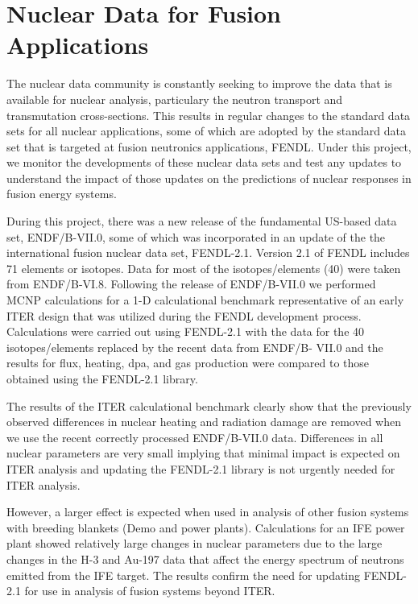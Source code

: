 \chapter{Nuclear Data for Fusion Applications}

The nuclear data community is constantly seeking to improve the data that is
available for nuclear analysis, particulary the neutron transport and
transmutation cross-sections.  This results in regular changes to the standard
data sets for all nuclear applications, some of which are adopted by the
standard data set that is targeted at fusion neutronics applications,
\gls{FENDL}.  Under this project, we monitor the developments of these nuclear
data sets and test any updates to understand the impact of those updates on
the predictions of nuclear responses in fusion energy systems.

During this project, there was a new release of the fundamental US-based data
set, ENDF/B-VII.0, some of which was incorporated in an update of the the
international fusion nuclear data set, FENDL-2.1.  Version 2.1 of \gls{FENDL}
includes 71 elements or isotopes.  Data for most of the isotopes/elements (40)
were taken from ENDF/B-VI.8. Following the release of ENDF/B-VII.0 we
performed MCNP calculations for a 1-D calculational benchmark representative
of an early ITER design that was utilized during the FENDL development
process. Calculations were carried out using FENDL-2.1 with the data for the
40 isotopes/elements replaced by the recent data from ENDF/B- VII.0 and the
results for flux, heating, dpa, and gas production were compared to those
obtained using the FENDL-2.1 library.

The results of the ITER calculational benchmark clearly show that the
previously observed differences in nuclear heating and radiation damage are
removed when we use the recent correctly processed ENDF/B-VII.0
data. Differences in all nuclear parameters are very small implying that
minimal impact is expected on ITER analysis and updating the FENDL-2.1 library
is not urgently needed for ITER analysis.

However, a larger effect is expected when used in analysis of other fusion
systems with breeding blankets (Demo and power plants). Calculations for an
\gls{IFE} power plant showed relatively large changes in nuclear
parameters due to the large changes in the H-3 and Au-197 data that affect the
energy spectrum of neutrons emitted from the \gls{IFE} target. The results confirm
the need for updating FENDL-2.1 for use in analysis of fusion systems beyond
ITER.

